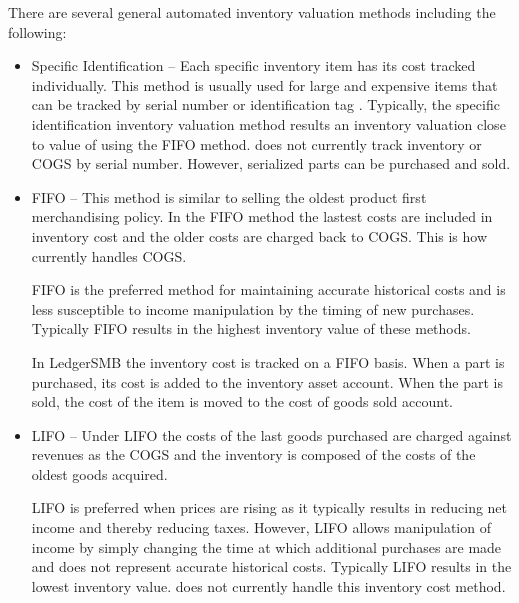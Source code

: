 There are several general automated inventory valuation methods including the following:
\begin{itemize}
        \item Specific Identification -- Each specific inventory item has its cost tracked individually. 
        This method is usually used for large and expensive items that can be tracked by 
        serial number  or  identification tag . 
        Typically, the specific identification inventory valuation method results an inventory valuation
        close to value of using the \gls{FIFO} method.
        \textbf{}
        \lsmbsp does not currently track inventory or \gls{COGS} by serial number.  However, serialized parts can be purchased and sold. 
        
        \item \gls{FIFO} -- This method is similar to selling the oldest product first merchandising policy.
        In the \gls{FIFO} method the lastest costs are included in inventory cost and the older costs
        are charged back to \gls{COGS}.  This is how \lsmbsp currently handles COGS.

        \gls{FIFO} is the preferred method for maintaining accurate historical costs and is less 
        susceptible to income manipulation by the timing of new purchases. Typically \gls{FIFO}
        results in the highest inventory value of these methods.
        
        In LedgerSMB the inventory cost is tracked on a \gls{FIFO} basis. When a part is purchased, 
        its cost is added to the inventory asset account. When the part is sold, the cost of the item
        is moved to the cost of goods sold account.\\

        \item \gls{LIFO} --  Under \gls{LIFO} the costs of the last goods purchased are charged
        against revenues as the \gls{COGS} and the inventory is composed of the costs
        of the oldest goods acquired.
        
        \gls{LIFO} is preferred when prices are rising as it typically results in reducing net income and
        thereby reducing taxes. However, \gls{LIFO} allows manipulation of income by simply changing the time
        at which additional purchases are made and does not represent accurate historical costs. 
        Typically \gls{LIFO} results in the lowest inventory value. \lsmbsp does not currently handle this 
        inventory cost method.
        

\end{itemize}

